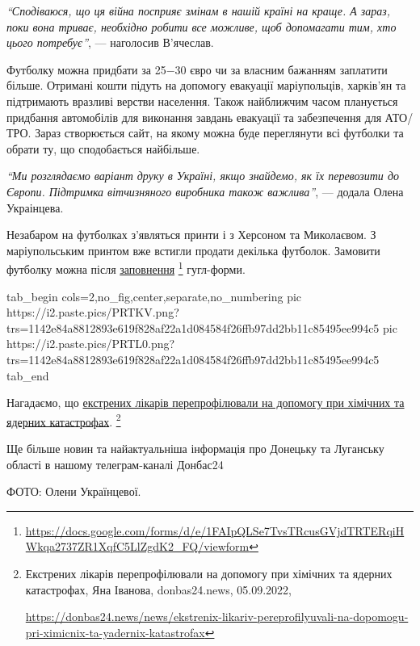 
\begin{leftbar}
\emph{\enquote{Сподіваюся, що ця війна посприяє змінам в нашій країні на краще. А зараз, поки
вона триває, необхідно робити все можливе, щоб допомагати тим, хто цього
потребує}}, — наголосив В'ячеслав.  
\end{leftbar}

Футболку можна придбати за 25−30 євро чи за власним бажанням заплатити більше.
Отримані кошти підуть на допомогу евакуації маріупольців, харків'ян та
підтримають вразливі верстви населення. Також найближчим часом планується
придбання автомобілів для виконання завдань евакуації та забезпечення для
АТО/ТРО. Зараз створюється сайт, на якому можна буде переглянути всі футболки
та обрати ту, що сподобається найбільше.


\begin{leftbar}
\emph{\enquote{Ми розглядаємо варіант друку в Україні, якщо знайдемо, як їх перевозити до
Європи. Підтримка вітчизняного виробника також важлива}}, — додала Олена
Украінцева.
\end{leftbar}

Незабаром на футболках з'являться принти і з Херсоном та Миколаєвом. З
маріупольським принтом вже встигли продати декілька футболок. Замовити футболку
можна після \href{https://docs.google.com/forms/d/e/1FAIpQLSe7TvsTRcusGVjdTRTERqiHWkqa2737ZR1XqfC5LlZgdK2_FQ/viewform}{заповнення}%
\footnote{\url{https://docs.google.com/forms/d/e/1FAIpQLSe7TvsTRcusGVjdTRTERqiHWkqa2737ZR1XqfC5LlZgdK2_FQ/viewform}}
гугл-форми.


\ifcmt
  tab_begin cols=2,no_fig,center,separate,no_numbering
     pic https://i2.paste.pics/PRTKV.png?trs=1142e84a8812893e619f828af22a1d084584f26ffb97dd2bb11c85495ee994c5
     pic https://i2.paste.pics/PRTL0.png?trs=1142e84a8812893e619f828af22a1d084584f26ffb97dd2bb11c85495ee994c5
  tab_end
\fi

Нагадаємо, що \href{https://donbas24.news/news/ekstrenix-likariv-pereprofilyuvali-na-dopomogu-pri-ximicnix-ta-yadernix-katastrofax}{екстрених лікарів перепрофілювали на допомогу при хімічних та
ядерних катастрофах}.%
\footnote{Екстрених лікарів перепрофілювали на допомогу при хімічних та ядерних катастрофах, Яна Іванова, donbas24.news, 05.09.2022, \par\url{https://donbas24.news/news/ekstrenix-likariv-pereprofilyuvali-na-dopomogu-pri-ximicnix-ta-yadernix-katastrofax}}

Ще більше новин та найактуальніша інформація про Донецьку та Луганську області
в нашому телеграм-каналі Донбас24

ФОТО: Олени Українцевої.

